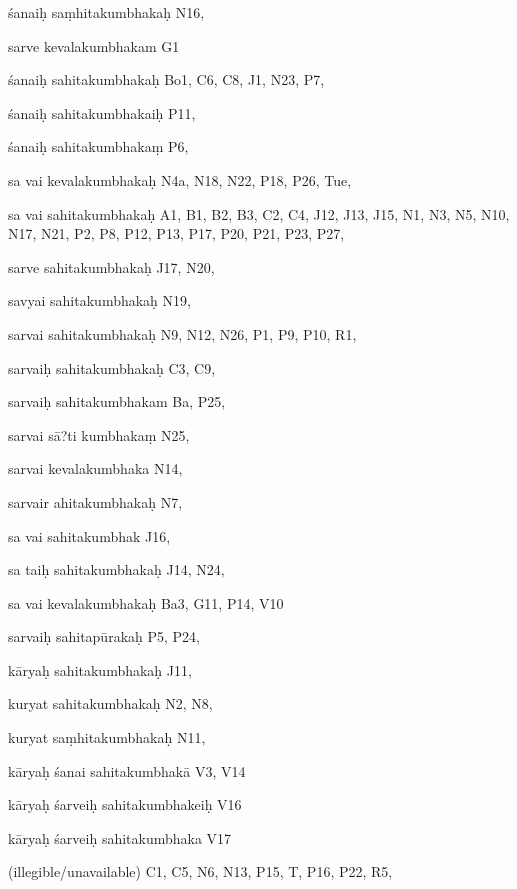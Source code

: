 \begin{ekdosis}
\begin{marma}[hp01_055]
\begin{marma}[hp02_009]
\begin{marma}[hp02_011]
\begin{marma}[hp02_73b]
\item[śanaiḥ saṃhitakumbhakaḥ] N16, 
\item[sarve kevalakumbhakam] G1
\item[śanaiḥ sahitakumbhakaḥ] Bo1, C6, C8, J1, N23, P7, 
\item[śanaiḥ sahitakumbhakaiḥ] P11,
\item[śanaiḥ sahitakumbhakaṃ] P6, 
\item[sa vai kevalakumbhakaḥ] N4a, N18, N22, P18, P26, Tue, 
\item[sa vai sahitakumbhakaḥ] A1, B1, B2, B3, C2, C4, J12, J13, J15, N1, N3, N5, N10, N17, N21, P2, P8, P12, P13, P17, P20, P21, P23, P27, 
\item[sarve sahitakumbhakaḥ] J17, N20, 
\item[savyai sahitakumbhakaḥ] N19, 
\item[sarvai sahitakumbhakaḥ] N9, N12, N26, P1, P9, P10, R1, 
\item[sarvaiḥ sahitakumbhakaḥ] C3, C9, 
\item[sarvaiḥ sahitakumbhakam] Ba, P25,
\item[sarvai sā?ti kumbhakaṃ] N25,
\item[sarvai kevalakumbhaka] N14,
\item[sarvair ahitakumbhakaḥ] N7, 
\item[sa vai sahitakumbhak] J16, 
\item[sa taiḥ sahitakumbhakaḥ] J14, N24, 
\item[sa vai kevalakumbhakaḥ] Ba3, G11, P14, V10
\item[sarvaiḥ sahitapūrakaḥ] P5, P24, 
\item[kāryaḥ sahitakumbhakaḥ] J11,
\item[kuryat sahitakumbhakaḥ] N2, N8, 
\item[kuryat saṃhitakumbhakaḥ] N11, 
\item[kāryaḥ śanai sahitakumbhakā] V3, V14
\item[kāryaḥ śarveiḥ sahitakumbhakeiḥ] V16
\item[kāryaḥ śarveiḥ sahitakumbhaka] V17
\item[(illegible/unavailable)] C1, C5, N6, N13, P15, T, P16, P22, R5,
  \begin{description}

    \end{description}
 \end{marma}


\end{marma}
\end{marma}
\end{marma}
\end{ekdosis}
